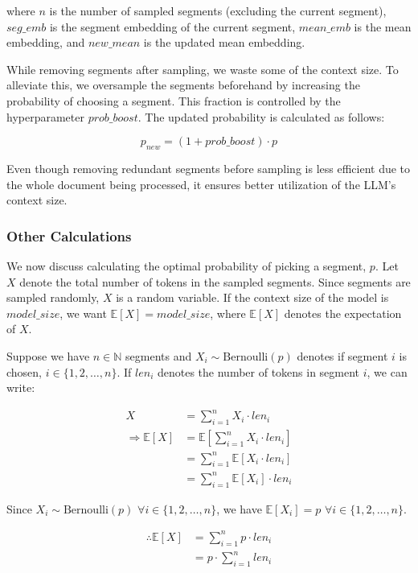 \noindent where $n$ is the number of sampled segments (excluding the current segment), $seg\_emb$ is the segment embedding of the current segment, $mean\_emb$ is the mean embedding, and $new\_mean$ is the updated mean embedding.

While removing segments after sampling, we waste some of the context size.
To alleviate this, we oversample the segments beforehand by increasing the probability of choosing a segment.
This fraction is controlled by the hyperparameter $prob\_boost$.
The updated probability is calculated as follows:

\[ p_{new} = (1 + prob\_boost) \cdot p \]

Even though removing redundant segments before sampling is less efficient due to the whole document being processed, it ensures better utilization of the LLM's context size.

\subsubsection*{Other Calculations}

We now discuss calculating the optimal probability of picking a segment, $p$.
Let $X$ denote the total number of tokens in the sampled segments.
Since segments are sampled randomly, $X$ is a random variable.
If the context size of the model is $model\_size$, we want $\mathbb{E}[X] = model\_size$, where $\mathbb{E}[X]$ denotes the expectation of $X$.

Suppose we have $n \in \mathbb{N}$ segments and $X_i \sim \mathrm{Bernoulli}(p)$ denotes if segment $i$ is chosen, $i \in \{1, 2, \dots, n\}$.
If $len_i$ denotes the number of tokens in segment $i$, we can write:

\begin{align*}
  X &= \sum_{i = 1}^{n} X_i \cdot len_i \\
  \Rightarrow \mathbb{E}[X] &= \mathbb{E}[\sum_{i = 1}^{n} X_i \cdot len_i] \\
  &= \sum_{i = 1}^{n} \mathbb{E}[X_i \cdot len_i] \\
  &= \sum_{i = 1}^{n} \mathbb{E}[X_i] \cdot len_i
\end{align*}

Since $X_i \sim \mathrm{Bernoulli}(p)$ $\forall i \in \{1, 2, \dots, n\}$, we have $\mathbb{E}[X_i] = p$ $\forall i \in \{1, 2, \dots, n\}$.

\begin{align*}
  \therefore \mathbb{E}[X] &= \sum_{i = 1}^{n} p \cdot len_i \\
  &= p \cdot \sum_{i = 1}^{n} len_i
\end{align*}


